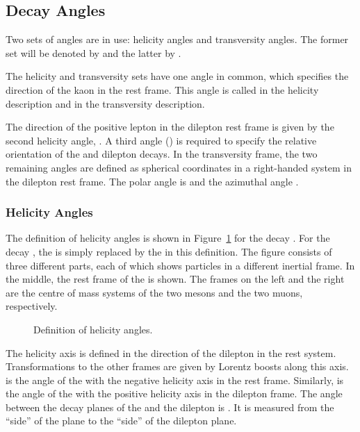 \subsection{Decay Angles} \label{sec:decAngles}
Two sets of angles are in use: helicity angles and transversity angles. The former set will be
denoted by \helSet{} and the latter by \trSet.

The helicity and transversity sets have one angle in common, which specifies the direction of the
kaon in the \Kst{} rest frame. This angle is called \thetak{} in the helicity description and
\psitr{} in the transversity description.

The direction of the positive lepton in the dilepton rest frame is given by the second helicity
angle, \thetal{}. A third angle (\phihel{}) is required to specify the relative orientation of the
\Kst{} and dilepton decays. In the transversity frame, the two remaining angles are defined as
spherical coordinates in a right-handed system in the dilepton rest frame. The polar angle is
\thetatr{} and the azimuthal angle \phitr{}.



\subsubsection{Helicity Angles} \label{sec:helAngles}
The definition of helicity angles is shown in Figure~\ref{fig:helFrame} for the decay \BdtomumuKpi.
For the decay \BstomumuKK, the \pion[-] is simply replaced by the \kaon[-] in this definition. The
figure consists of three different parts, each of which shows particles in a different inertial
frame. In the middle, the rest frame of the \B[][0] is shown. The frames on the left and the right
are the centre of mass systems of the two mesons and the two muons, respectively.
\begin{figure}[htbp]
  \centering
  \resizebox{\textwidth}{!}{}
  \caption{Definition of helicity angles.}
  \label{fig:helFrame}
\end{figure}

The helicity axis is defined in the direction of the dilepton in the \B[][0] rest system.
Transformations to the other frames are given by Lorentz boosts along this axis. \thetak{} is the
angle of the \kaon[+] with the negative helicity axis in the \Kst{} rest frame. Similarly,
\thetal{} is the angle of the \muon[+] with the positive helicity axis in the dilepton frame. The
angle between the decay planes of the \Kst{} and the dilepton is \phihel. It is measured from the
``\pion[-] side'' of the \Kst{} plane to the ``\muon[+] side'' of the dilepton plane.

